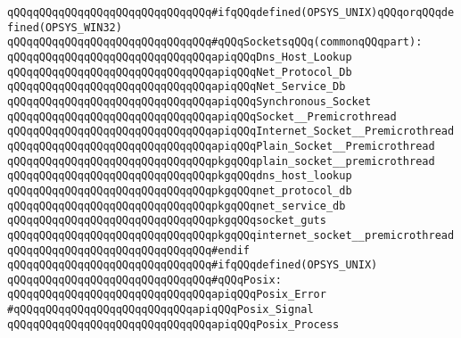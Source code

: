 \newline
\verb|qQQqqQQqqQQqqQQqqQQqqQQqqQQqqQQq#ifqQQqdefined(OPSYS_UNIX)qQQqorqQQqdefined(OPSYS_WIN32)|\newline
\verb|qQQqqQQqqQQqqQQqqQQqqQQqqQQqqQQq#qQQqSocketsqQQq(commonqQQqpart):|\newline
\verb|qQQqqQQqqQQqqQQqqQQqqQQqqQQqqQQqapiqQQqDns_Host_Lookup|\newline
\verb|qQQqqQQqqQQqqQQqqQQqqQQqqQQqqQQqapiqQQqNet_Protocol_Db|\newline
\verb|qQQqqQQqqQQqqQQqqQQqqQQqqQQqqQQqapiqQQqNet_Service_Db|\newline
\newline
\verb|qQQqqQQqqQQqqQQqqQQqqQQqqQQqqQQqapiqQQqSynchronous_Socket|\newline
\verb|qQQqqQQqqQQqqQQqqQQqqQQqqQQqqQQqapiqQQqSocket__Premicrothread|\newline
\verb|qQQqqQQqqQQqqQQqqQQqqQQqqQQqqQQqapiqQQqInternet_Socket__Premicrothread|\newline
\verb|qQQqqQQqqQQqqQQqqQQqqQQqqQQqqQQqapiqQQqPlain_Socket__Premicrothread|\newline
\newline
\verb|qQQqqQQqqQQqqQQqqQQqqQQqqQQqqQQqpkgqQQqplain_socket__premicrothread|\newline
\verb|qQQqqQQqqQQqqQQqqQQqqQQqqQQqqQQqpkgqQQqdns_host_lookup|\newline
\verb|qQQqqQQqqQQqqQQqqQQqqQQqqQQqqQQqpkgqQQqnet_protocol_db|\newline
\verb|qQQqqQQqqQQqqQQqqQQqqQQqqQQqqQQqpkgqQQqnet_service_db|\newline
\verb|qQQqqQQqqQQqqQQqqQQqqQQqqQQqqQQqpkgqQQqsocket_guts|\newline
\verb|qQQqqQQqqQQqqQQqqQQqqQQqqQQqqQQqpkgqQQqinternet_socket__premicrothread|\newline
\verb|qQQqqQQqqQQqqQQqqQQqqQQqqQQqqQQq#endif|\newline
\newline
\newline
\verb|qQQqqQQqqQQqqQQqqQQqqQQqqQQqqQQq#ifqQQqdefined(OPSYS_UNIX)|\newline
\verb|qQQqqQQqqQQqqQQqqQQqqQQqqQQqqQQq#qQQqPosix:|\newline
\verb|qQQqqQQqqQQqqQQqqQQqqQQqqQQqqQQqapiqQQqPosix_Error|\newline
\verb|#qQQqqQQqqQQqqQQqqQQqqQQqqQQqapiqQQqPosix_Signal|\newline
\verb|qQQqqQQqqQQqqQQqqQQqqQQqqQQqqQQqapiqQQqPosix_Process|\newline

